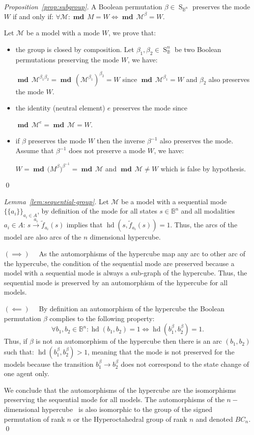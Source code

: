 \documentclass[12pt]{elsarticle}
\newcommand{\Bset}[0]{\mathbb{B}}
\newcommand{\evo}[0]{\longrightarrow}
\newcommand{\xevo}[1]{\stackrel{#1}{\evo}}
\newcommand{\mode}[0]{\operatorname{\textbf{md}} \,}
\newcommand{\gsym}[1]{\operatorname{S}_{#1}}
\begin{document}
\begin{proof}[Proposition~\ref{prop:subgroup}]
A Boolean permutation $\beta \in \gsym{\Bset^n}$ preserves the mode $W$ if and only if: 
$\forall \mathcal M: \mode M =W \iff \mode \mathcal M^\beta=W.$

Let $\mathcal M$ be a model with a mode $W$, we prove that:
\begin{itemize}
\item the group is closed by composition. Let $\beta_1,\beta_2 \in \gsym \Bset^n$ be two Boolean permutations preserving the mode $W$, we have: 

$\mode \mathcal M^{\beta_1\beta_2} = \mode (\mathcal M^{\beta_1})^{\beta_2} = W$ since $\mode \mathcal M^{\beta_1} = W$ and $\beta_2$ also preserves the mode $W$.
\item the identity (neutral element) $e$ preserves the mode since 

$\mode \mathcal M^e = \mode \mathcal M = W$.
\item if $\beta$ preserves the mode $W$ then the inverse $\beta^{-1}$ also preserves the mode. 
Assume that $\beta^{-1}$ does not preserve a mode $W$, we have:

$W=\mode \mathcal (M^\beta
)^{\beta^{-1}} =  \mode \mathcal M$ and $\mode \mathcal M \neq W$ which is false by hypothesis.
\end{itemize} 
\qed \end{proof}

\begin{proof}[Lemma~\ref{lem:sequential-group}] 
Let $\mathcal M$ be a model with a sequential mode  $\{\{a_i\}\}_{a_i \in A}$, by definition of the mode for all states $s \in \Bset^n$ and all modalities $a_i \in A$:  $s \xevo{a_i} \tilde f_{a_i}(s)$ implies that $\operatorname{hd}(s,\tilde f_{a_i}(s))=1$. Thus, the arcs of the model are also arcs of the $n$ dimensional hypercube.

\noindent
$(\implies) \quad$ As the automorphisms of the hypercube map any arc to other arc of the hypercube, the condition of the sequential mode are preserved because a model with a sequential mode is always a sub-graph of the hypercube. Thus, the sequential mode is preserved by an automorphism of the hypercube for all models. 

\noindent
\medskip
$(\impliedby) \quad$ 
By definition an automorphism of the hypercube the Boolean permutation $\beta$ complies to the following property: 
$$\forall b_1,b_2 \in \Bset^n: \operatorname{hd}(b_1,b_2)=1 \iff \operatorname{hd}(b_1^\beta,b_2^\beta)=1.$$ 
Thus, if $\beta$ is not an automorphism of the hypercube then there is an arc $(b_1,b_2)$ such that: $\operatorname{hd}(b_1^\beta, b_2^\beta) > 1$, meaning that the mode is not preserved for the models because the transition $b_1^\beta \evo  b_2^\beta$ does not correspond to the state change of one agent only.

We conclude that the automorphisms of the hypercube are the isomorphisms preserving the sequential mode for all models. The automorphisms of the $n-$dimensional hypercube~\cite{Harary2000, Chen1993} is also  isomorphic to the group of the signed permutation of rank $n$ or the Hyperoctahedral group of rank $n$ and denoted $BC_n$.
\qed \end{proof}
\end{document}
